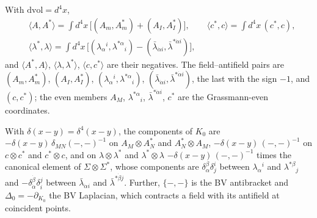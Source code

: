 \begin{remark}
With $\mathrm{dvol}=d^4x$,
\[
\begin{aligned}
&\langle A,A^*\rangle=\int d^4x\,\big[(A_m,A^*_m)+(A_I,A^*_I)\big],\qquad \langle c^*,c\rangle=\int d^4x\,(c^*,c),\\
&\langle\lambda^*,\lambda\rangle=\int d^4x\,\big[(\lambda_\alpha{}^i,\lambda^{*\alpha}{}_i)-(\bar\lambda_{\dot\alpha i},\bar\lambda^{*\dot\alpha i})\big],
\end{aligned}
\]
and $\langle A^*,A\rangle$, $\langle\lambda,\lambda^*\rangle$, $\langle c,c^*\rangle$ are their negatives. The field--antifield pairs are $(A_m,A^*_m)$, $(A_I,A^*_I)$, $(\lambda_\alpha{}^i,\lambda^{*\alpha}{}_i)$, $(\bar\lambda_{\dot\alpha i},\bar\lambda^{*\dot\alpha i})$, the last with the sign $-1$, and $(c,c^*)$; the even members $A_M$, $\lambda^{*\alpha}{}_i$, $\bar\lambda^{*\dot\alpha i}$, $c^*$ are the Grassmann-even coordinates.
\end{remark}

\begin{remark}
With $\delta(x-y)=\delta^4(x-y)$, the components of $K_0$ are $-\delta(x-y)\,\delta_{MN}(-,-)^{-1}$ on $A_M\otimes A^*_N$ and $A^*_N\otimes A_M$, $-\delta(x-y)\,(-,-)^{-1}$ on $c\otimes c^*$ and $c^*\otimes c$, and on $\lambda\otimes\lambda^*$ and $\lambda^*\otimes\lambda$ $-\delta(x-y)\,(-,-)^{-1}$ times the canonical element of $\Sigma\otimes\Sigma^*$, whose components are $\delta_\alpha^\beta\delta^i_j$ between $\lambda_\alpha{}^i$ and $\lambda^{*\beta}{}_j$ and $-\delta_{\dot\alpha}^{\dot\beta}\delta_i^j$ between $\bar\lambda_{\dot\alpha i}$ and $\bar\lambda^{*\dot\beta j}$. Further, $\{-,-\}$ is the BV antibracket and $\Delta_0=-\partial_{K_0}$ the BV Laplacian, which contracts a field with its antifield at coincident points.
\end{remark}

